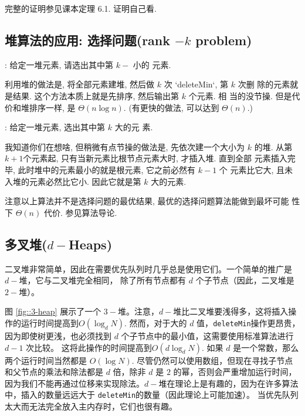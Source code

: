 \documentclass[a4paper]{ctexart}
\theoremstyle{definition}
\theoremstyle{definition}
\begin{document}
完整的证明参见课本定理 6.1. 证明自己看.

\subsection{堆算法的应用: 选择问题(rank $-k$ problem) }

: 给定一堆元素, 请选出其中第 $k-$ 小的
元素.

利用堆的做法是, 将全部元素建堆, 然后做 $k$ 次 `deleteMin`, 第 $k$ 次删
除的元素就是结果. 这个方法本质上就是先排序, 然后输出第 $k$ 个元素. 相
当的没节操. 但是代价和堆排序一样, 是 $\Theta(n \log n)$. (有更快的做法,
可以达到 $\Theta(n)$.)

: 给定一堆元素, 选出其中第 $k$ 大的元
素.

我知道你们在想啥, 但稍微有点节操的做法是, 先依次建一个大小为 $k$ 的堆.
从第 $k + 1$个元素起, 只有当新元素比根节点元素大时, 才插入堆. 直到全部
元素插入完毕, 此时堆中的元素最小的就是根元素, 它之前必然有 $k - 1$ 个
元素比它大, 且未入堆的元素必然比它小. 因此它就是第 $k$ 大的元素.

注意以上算法并不是选择问题的最优结果, 最优的选择问题算法能做到最坏可能
性下 $\Theta(n)$ 代价. 参见算法导论. 

\subsection{多叉堆($d-$Heaps)}


二叉堆非常简单，因此在需要优先队列时几乎总是使用它们。一个简单的推广是 $d-$堆，它与二叉堆完全相同，
除了所有节点都有 $d$ 个子节点（因此，二叉堆是 $2-$堆）。

图 \ref{fig::3-heap} 展示了一个 $3-$堆。注意，$d-$堆比二叉堆要浅得多，这将插入操作的运行时间提高到\(O(\log_d N)\). 
然而，对于大的 $d$ 值，\verb|deleteMin|操作更昂贵，因为即使树更浅，也必须找到 $d$ 个子节点中的最小值，这需要使用标准算法进行 $d - 1$ 次比较。
这将此操作的时间提高到\(O(d \log_d N)\). 如果 $d$ 是一个常数，那么两个运行时间当然都是 \(O(\log N)\). 
尽管仍然可以使用数组，但现在寻找子节点和父节点的乘法和除法都是 $d$ 倍，除非 $d$ 是 $2$ 的幂，否则会严重增加运行时间，
因为我们不能再通过位移来实现除法。$d-$堆在理论上是有趣的，因为在许多算法中，插入的数量远远大于 \verb|deleteMin|的数量（因此理论上可能加速）。
当优先队列太大而无法完全放入主内存时，它们也很有趣。 
\end{document}
